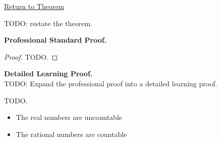 \newpage
{}
\label{prf:irrationals-uncountable}

\begin{remark*}[Return]
\hyperref[thm:irrationals-uncountable]{Return to Theorem}
\end{remark*}

\begin{theorem*}
TODO: restate the theorem.
\end{theorem*}

\textbf{Professional Standard Proof.}~\\
\begin{proof}
TODO.
\end{proof}

\textbf{Detailed Learning Proof.}~\\
TODO: Expand the professional proof into a detailed learning proof.


\begin{remark*}
TODO.
\end{remark*}

\begin{dependencies}
\begin{itemize}
  \item The real numbers are uncountable
  \item The rational numbers are countable
\end{itemize}
\end{dependencies}

